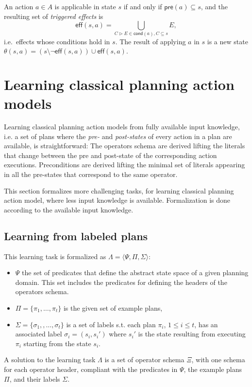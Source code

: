 \documentclass[letterpaper]{article} %
\newcommand{\tup}[1]{{\langle #1 \rangle}}
\newcommand{\pre}{\mathsf{pre}}     %
\newcommand{\eff}{\mathsf{eff}}     %
\newcommand{\cond}{\mathsf{cond}}   %
\begin{document}
An action $a\in A$ is applicable in state $s$ if and only if $\pre(a)\subseteq s$, and the resulting set of {\em triggered effects} is
\[
\eff(s,a)=\bigcup_{C\rhd E\in\cond(a),C\subseteq s} E,
\]
i.e.~effects whose conditions hold in $s$. The result of applying $a$ in $s$ is a new state $\theta(s,a)=(s\setminus \neg\eff(s,a))\cup\eff(s,a)$.


\section{Learning classical planning action models}
Learning classical planning action models from fully available input knowledge, i.e. a set of plans where the {\em pre-} and {\em post-states} of every action in a plan are available, is straightforward: The operators schema are derived lifting the literals that change between the pre and post-state of the corresponding action executions. Preconditions are derived lifting the minimal set of literals appearing in all the pre-states that correspond to the same operator.

This section formalizes more challenging tasks, for learning classical planning action model, where less input knowledge is available. Formalization is done according to the available input knowledge.

\subsection{Learning from labeled plans}
This learning task is formalized as $\Lambda=\tup{\Psi,\Pi,\Sigma}$: 
\begin{itemize}
\item $\Psi$ the set of predicates that define the abstract state space of a given planning domain. This set includes the predicates for defining the headers of the operators schema.
\item $\Pi=\{\pi_1,\ldots,\pi_t\}$ is the given set of example plans,
\item $\Sigma=\{\sigma_1,,\ldots,\sigma_t\}$ is a set of labels s.t. each plan $\pi_i$, {\small $1\leq i\leq t$}, has an associated label $\sigma_i=(s_i,s_i')$ where $s_i'$ is the state resulting from executing $\pi_i$ starting from the state $s_i$. 
\end{itemize}

A solution to the learning task $\Lambda$ is a set of operator schema $\Xi$, with one schema for each operator header, compliant with the predicates in $\Psi$, the example plans $\Pi$, and their labels $\Sigma$.
\end{document}
